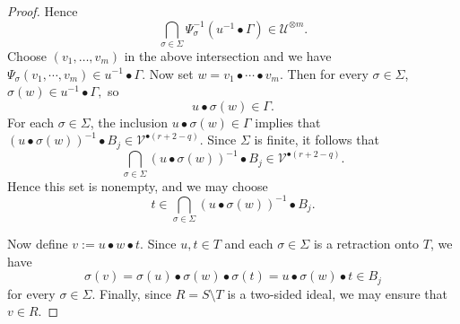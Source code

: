\documentclass[10pt,a4paper]{amsart}
\begin{document}
\begin{proof}
Hence
\[
\bigcap_{\sigma \in \Sigma} \Psi_\sigma^{-1}(u^{-1} \bullet \Gamma) \in \mathcal{U}^{\otimes m}.
\]
Choose $(v_1,\dots,v_m)$ in the above intersection and we have $\Psi_{\sigma}(v_1, \cdots , v_m) \in u^{-1} \bullet \Gamma.$ Now set $w = v_1 \bullet \cdots \bullet v_m$. Then for every $\sigma \in \Sigma$, $\sigma(w) \in u^{-1} \bullet \Gamma,$
so
\[
u \bullet \sigma(w) \in \Gamma.
\]
For each $\sigma\in\Sigma$, the inclusion $u \bullet \sigma(w)\in\Gamma$ implies that $(u \bullet \sigma(w))^{-1} \bullet B_j\in\mathcal{V}^{\bullet(r+2-q)}.
$
Since $\Sigma$ is finite, it follows that
\[
\bigcap_{\sigma\in\Sigma}(u \bullet \sigma(w))^{-1} \bullet B_j
\in\mathcal{V}^{\bullet(r+2-q)}.
\]
Hence this set is nonempty, and we may choose
\[
t\in \bigcap_{\sigma\in\Sigma}(u \bullet \sigma(w))^{-1} \bullet B_j.
\]



Now define $v:=u \bullet w \bullet t.$ Since $u,t\in T$ and each $\sigma\in\Sigma$ is a retraction onto $T$, we have 
\[
\sigma(v)=\sigma(u) \bullet \sigma(w) \bullet \sigma(t)=u \bullet \sigma(w) \bullet t\in B_j
\]
for every $\sigma\in\Sigma$. Finally, since $R = S \setminus T$ is a two-sided ideal, we may ensure that $v \in R$.
\end{proof}
\end{document}
